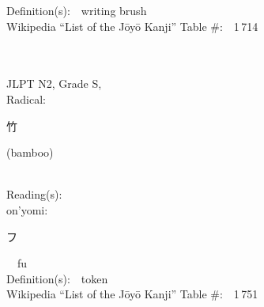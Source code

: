 \begin{multicols}{2}
Definition(s):\ \ writing brush \\
Wikipedia ``List of the J\=oy\=o Kanji'' Table \#:\ \ 1\,714 \\
\ \ \\
{\fontsize{34pt}{40pt}  }\ \ \\  %
{JLPT N2, Grade S, \\Radical:\ \ {\begin{CJK}{UTF8}{min} 竹 \end{CJK}} (bamboo) } \\
Reading(s):\ \ \\
{\hspace*{1em}}on'yomi:\ \ \\
{\hspace*{2em}}{\begin{CJK}{UTF8}{min} フ \end{CJK}}\ \ fu\ \ \\
Definition(s):\ \ token \\
Wikipedia ``List of the J\=oy\=o Kanji'' Table \#:\ \ 1\,751 \\
\ \ \\
\end{multicols}



